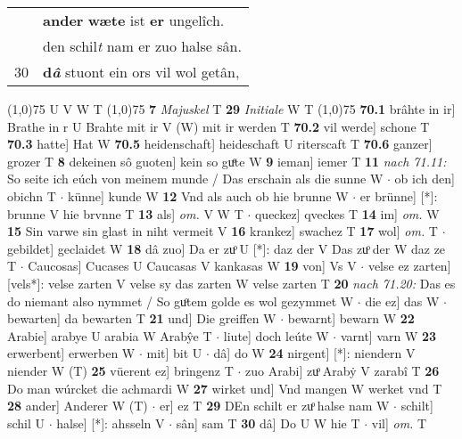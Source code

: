\documentclass[8pt,a4paper,notitlepage]{article}
\begin{document}
\begin{table}[ht]
\begin{minipage}[t]{0.5\linewidth}
\begin{tabular}{rl}
 & \textbf{ander} \textbf{wæte} ist \textbf{er} ungelîch.\\ 
 & den schil\textit{t} nam er zuo halse sân.\\ 
30 & \textbf{d\textit{â}} stuont ein ors vil wol getân,\\ 
\end{tabular}
\scriptsize
\line(1,0){75} \newline
U V W T \newline
\line(1,0){75} \newline
\textbf{7} \textit{Majuskel} T  \textbf{29} \textit{Initiale} W T  \newline
\line(1,0){75} \newline
\textbf{70.1} brâhte in ir] Brathe in r U Brahte mit ir V (W) mit ir werden T \textbf{70.2} vil werde] schone T \textbf{70.3} hatte] Hat W \textbf{70.5} heidenschaft] heideschaft U riterscaft T \textbf{70.6} ganzer] grozer T \textbf{8} dekeinen sô guoten] kein so guͤte W \textbf{9} ieman] iemer T \textbf{11} \textit{nach 71.11:} So seite ich eúch von meinem munde / Das erschain als die sunne W   $\cdot$ ob ich den] obichn T  $\cdot$ künne] kunde W \textbf{12} Vnd als auch ob hie brunne W  $\cdot$ er brünne] [*]: brunne V hie brvnne T \textbf{13} als] \textit{om.} V W T  $\cdot$ queckez] qveckes T \textbf{14} im] \textit{om.} W \textbf{15} Sin varwe sin glast in niht vermeit V \textbf{16} krankez] swachez T \textbf{17} wol] \textit{om.} T  $\cdot$ gebildet] geclaidet W \textbf{18} dâ zuo] Da er zuͦ U [*]: daz der V Das zuͦ der W daz ze T  $\cdot$ Caucosas] Cucases U Caucasas V kankasas W \textbf{19} von] Vs V  $\cdot$ velse ez zarten] [vels*]: velse zarten V velse sy das zarten W velse zarten T \textbf{20} \textit{nach 71.20:} Das es do niemant also nymmet / So guͦtem golde es wol gezymmet W   $\cdot$ die ez] das W  $\cdot$ bewarten] da bewarten T \textbf{21} und] Die greiffen W  $\cdot$ bewarnt] bewarn W \textbf{22} Arabie] arabye U arabia W Arabŷe T  $\cdot$ liute] doch leúte W  $\cdot$ varnt] varn W \textbf{23} erwerbent] erwerben W  $\cdot$ mit] bit U  $\cdot$ dâ] do W \textbf{24} nirgent] [*]: niendern V niender W (T) \textbf{25} vüerent ez] bringenz T  $\cdot$ zuo Arabi] zuͦ Arabẏ V zarabî T \textbf{26} Do man wúrcket die achmardi W \textbf{27} wirket und] Vnd mangen W werket vnd T \textbf{28} ander] Anderer W (T)  $\cdot$ er] ez T \textbf{29} DEn schilt er zuͦ halse nam W  $\cdot$ schilt] schil U  $\cdot$ halse] [*]: ahsseln V  $\cdot$ sân] sam T \textbf{30} dâ] Do U W hie T  $\cdot$ vil] \textit{om.} T \newline
\end{minipage}
\end{table}
\end{document}
